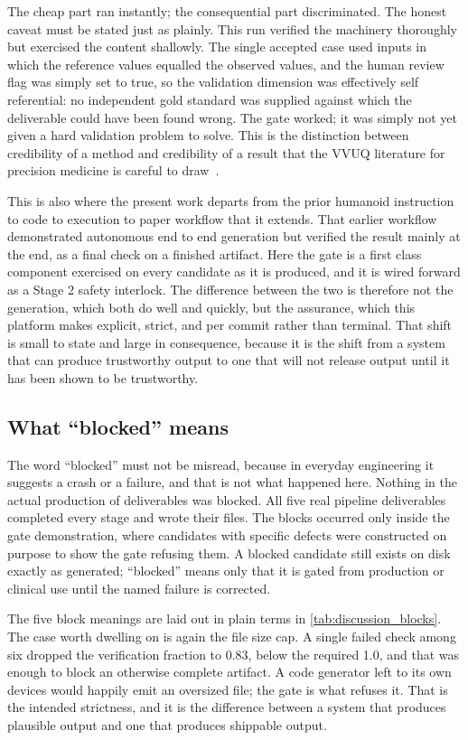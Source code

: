 The cheap part ran instantly; the
consequential part discriminated. The honest caveat must be stated just as
plainly. This run verified the machinery thoroughly but exercised the content
shallowly. The single accepted case used inputs in which the reference values
equalled the observed values, and the human review flag was simply set to true,
so the validation dimension was effectively self referential: no independent gold
standard was supplied against which the deliverable could have been found wrong.
The gate worked; it was simply not yet given a hard validation problem to solve.
This is the distinction between credibility of a method and credibility of a
result that the VVUQ literature for precision medicine is careful to
draw~\cite{sel2025vvuq}.

This is also where the present work departs from the prior humanoid instruction
to code to execution to paper workflow that it extends. That earlier workflow
demonstrated autonomous end to end generation but verified the result mainly at
the end, as a final check on a finished artifact. Here the gate is a first class
component exercised on every candidate as it is produced, and it is wired forward
as a Stage 2 safety interlock. The difference between the two is therefore not
the generation, which both do well and quickly, but the assurance, which this
platform makes explicit, strict, and per commit rather than terminal. That shift
is small to state and large in consequence, because it is the shift from a system
that can produce trustworthy output to one that will not release output until it
has been shown to be trustworthy.

\subsection{What ``blocked'' means}

The word ``blocked'' must not be misread, because in everyday engineering it
suggests a crash or a failure, and that is not what happened here. Nothing in the
actual production of deliverables was blocked. All five real pipeline deliverables
completed every stage and wrote their files. The blocks occurred only inside the
gate demonstration, where candidates with specific defects were constructed on
purpose to show the gate refusing them. A blocked candidate still exists on disk
exactly as generated; ``blocked'' means only that it is gated from production or
clinical use until the named failure is corrected. 

The five block meanings are
laid out in plain terms in \autoref{tab:discussion_blocks}. The case worth
dwelling on is again the file size cap. A single failed check among six dropped
the verification fraction to 0.83, below the required 1.0, and that was enough to
block an otherwise complete artifact. A code generator left to its own devices
would happily emit an oversized file; the gate is what refuses it. That is the
intended strictness, and it is the difference between a system that produces
plausible output and one that produces shippable output.

